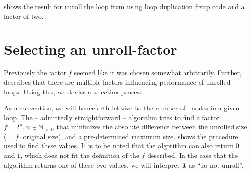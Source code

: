 shows the result for unroll the loop from  using loop duplication fixup code and a factor of two.








\newpage

\section{Selecting an unroll-factor}\label{sec:impl:sel-factor}

Previously the factor $f$ seemed like it was chosen somewhat arbitrarily.
Further,  describes that there are multiple factors influencing performance of unrolled loops.
Using this, we devise a selection process.

As a convention, we will henceforth let size be the number of~\libFIRM-nodes in a given loop.
The -- admittedly straightforward -- algorithm tries to find a factor $f = 2^n, n \in \mathbb{N}_{>0}$, that minimizes the absolute difference between the unrolled size ($= f \cdot \text{original size}$), and a pre-determined maximum size.
 shows the procedure used to find these values.
It is to be noted that the algorithm can also return $0$ and $1$, which does not fit the definition of the $f$ described.
In the case that the algorithm returns one of these two values, we will interpret it as ``do not unroll''.

